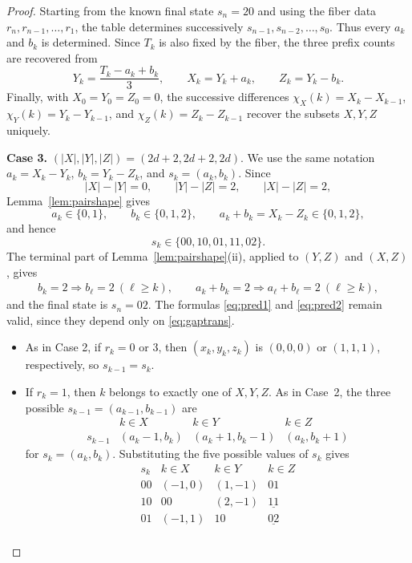 \documentclass[11pt]{amsart}
\theoremstyle{definition}
\numberwithin{equation}{section}
\begin{document}
\begin{proof}
Starting from the known final state $s_n=20$ and using the fiber data $r_n,r_{n-1},\ldots,r_1$, the table determines successively $s_{n-1},s_{n-2},\ldots,s_0$. Thus every $a_k$ and $b_k$ is determined. Since $T_k$ is also fixed by the fiber, the three prefix counts are recovered from
\begin{equation}\label{eq:recover}
 Y_k=\frac{T_k-a_k+b_k}{3},\qquad
 X_k=Y_k+a_k,\qquad
 Z_k=Y_k-b_k.
\end{equation}
Finally, with $X_0=Y_0=Z_0=0$, the successive differences $\chi_X(k)=X_k-X_{k-1}$, $\chi_Y(k)=Y_k-Y_{k-1}$, and $\chi_Z(k)=Z_k-Z_{k-1}$ recover the subsets $X,Y,Z$ uniquely.

\smallskip
\noindent
{\bf Case 3.} $(|X|,|Y|,|Z|)=(2d+2,2d+2,2d)$.
We use the same notation $a_k=X_k-Y_k$, $b_k=Y_k-Z_k$, and $s_k=(a_k,b_k)$.
Since
$$
 |X|-|Y|=0,\qquad |Y|-|Z|=2,\qquad |X|-|Z|=2,
$$
Lemma~\ref{lem:pairshape} gives
\[
 a_k\in\{0,1\},\qquad b_k\in\{0,1,2\},\qquad a_k+b_k = X_k -Z_k \in\{0,1,2\},
\]
and hence
\[
 s_k\in\{00,10,01,11,02\}.
\]
The terminal part of Lemma~\ref{lem:pairshape}(ii), applied to $(Y,Z)$ and $(X,Z)$, gives
\begin{align} \label{T_rule 2}
 b_k=2\Longrightarrow b_\ell=2\ (\ell\ge k),
 \qquad
 a_k+b_k=2\Longrightarrow a_\ell+b_\ell=2\ (\ell\ge k),
    \end{align}
and the final state is $s_n=02$.
The formulas \eqref{eq:pred1} and \eqref{eq:pred2} remain valid, since they depend only on \eqref{eq:gaptrans}. 
\begin{itemize}
\item 
As in Case 2, if $r_k=0$ or $3$, then $(x_k,y_k,z_k)$ is $(0,0,0)$ or $(1,1,1)$, respectively, so $s_{k-1}=s_k$. 
    \item 
If \(r_k=1\), then \(k\) belongs to exactly one of \(X,Y,Z\).  As in Case~2, the three possible $s_{k-1}=(a_{k-1},b_{k-1})$ are
$$
\begin{array}{c|ccc}
 & k\in X & k\in Y & k\in Z\\
\hline
s_{k-1}
&
(a_k-1,b_k)
&
(a_k+1,b_k-1)
&
(a_k,b_k+1)
\end{array}
$$
for \(s_k=(a_k,b_k)\).  Substituting the five possible values of \(s_k\) gives
$$
\begin{array}{c|ccc}
s_k
& k\in X
& k\in Y
& k\in Z\\
\hline
00 & (-1,0) & (1,-1) & 01\\
10 & 00 & (2,-1) & \underline{11}\\
01 & (-1,1) & 10 & \underline{02}\\

\end{array}$$
\end{itemize}
\end{proof}
\end{document}

